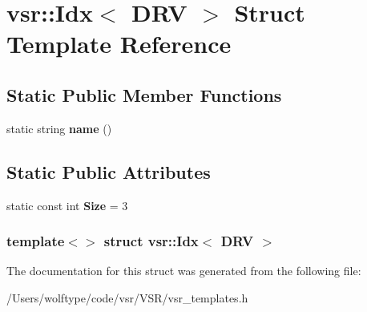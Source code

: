 \hypertarget{structvsr_1_1_idx_3_01_d_r_v_01_4}{\section{vsr\-:\-:Idx$<$ D\-R\-V $>$ Struct Template Reference}
\label{structvsr_1_1_idx_3_01_d_r_v_01_4}
}
\subsection*{Static Public Member Functions}
\begin{DoxyCompactItemize}
\item 
\hypertarget{structvsr_1_1_idx_3_01_d_r_v_01_4_a53ec318c648c8e13553a86578b6928c9}{static string {\bfseries name} ()}\label{structvsr_1_1_idx_3_01_d_r_v_01_4_a53ec318c648c8e13553a86578b6928c9}

\end{DoxyCompactItemize}
\subsection*{Static Public Attributes}
\begin{DoxyCompactItemize}
\item 
\hypertarget{structvsr_1_1_idx_3_01_d_r_v_01_4_ae19d54c72048c9e9e79014ee3badf1b0}{static const int {\bfseries Size} = 3}\label{structvsr_1_1_idx_3_01_d_r_v_01_4_ae19d54c72048c9e9e79014ee3badf1b0}

\end{DoxyCompactItemize}
\subsubsection*{template$<$$>$ struct vsr\-::\-Idx$<$ D\-R\-V $>$}



The documentation for this struct was generated from the following file\-:\begin{DoxyCompactItemize}
\item 
/\-Users/wolftype/code/vsr/\-V\-S\-R/vsr\-\_\-templates.\-h\end{DoxyCompactItemize}
